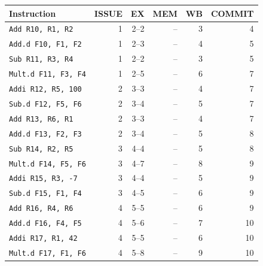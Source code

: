 \begin{tabular}{@{}lrrrrr@{}}\toprule
Instruction & ISSUE & EX & MEM & WB & COMMIT\\\midrule
\texttt{Add R10, R1, R2} & 1 & 2--2 & -- & 3 & 4 \\
\texttt{Add.d F10, F1, F2} & 1 & 2--3 & -- & 4 & 5 \\
\texttt{Sub R11, R3, R4} & 1 & 2--2 & -- & 3 & 5 \\
\texttt{Mult.d F11, F3, F4} & 1 & 2--5 & -- & 6 & 7 \\
\texttt{Addi R12, R5, 100} & 2 & 3--3 & -- & 4 & 7 \\
\texttt{Sub.d F12, F5, F6} & 2 & 3--4 & -- & 5 & 7 \\
\texttt{Add R13, R6, R1} & 2 & 3--3 & -- & 4 & 7 \\
\texttt{Add.d F13, F2, F3} & 2 & 3--4 & -- & 5 & 8 \\
\texttt{Sub R14, R2, R5} & 3 & 4--4 & -- & 5 & 8 \\
\texttt{Mult.d F14, F5, F6} & 3 & 4--7 & -- & 8 & 9 \\
\texttt{Addi R15, R3, -7} & 3 & 4--4 & -- & 5 & 9 \\
\texttt{Sub.d F15, F1, F4} & 3 & 4--5 & -- & 6 & 9 \\
\texttt{Add R16, R4, R6} & 4 & 5--5 & -- & 6 & 9 \\
\texttt{Add.d F16, F4, F5} & 4 & 5--6 & -- & 7 & 10 \\
\texttt{Addi R17, R1, 42} & 4 & 5--5 & -- & 6 & 10 \\
\texttt{Mult.d F17, F1, F6} & 4 & 5--8 & -- & 9 & 10 \\
\bottomrule\end{tabular}